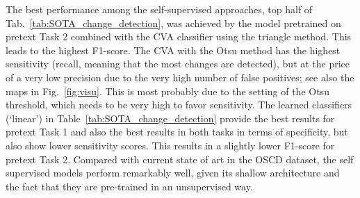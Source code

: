 \documentclass[runningheads]{llncs}
\begin{document}
The best performance among the self-supervised approaches, top half of Tab.~\ref{tab:SOTA_change_detection}, was achieved by the model pretrained on pretext Task 2 combined with the {CVA} classifier using the triangle method. This leads to the highest F1-score. The CVA with the Otsu method has the highest sensitivity (recall, meaning that the most changes are detected), but at the price of a very low precision due to the very high number of false positives; see also the maps in Fig.~\ref{fig:visu}. This is most probably due to the setting of the Otsu threshold, which needs to be very high to favor sensitivity. The learned classifiers (`linear') in Table~\ref{tab:SOTA_change_detection} provide the best results for pretext Task 1 and also the best results in both tasks in terms of specificity, but also show lower sensitivity scores. This results in a slightly lower F1-score for pretext Task 2. Compared with current state of art in the OSCD dataset, the self supervised models perform remarkably well, given its shallow architecture and the fact that they are pre-trained in an unsupervised way.
\end{document}
